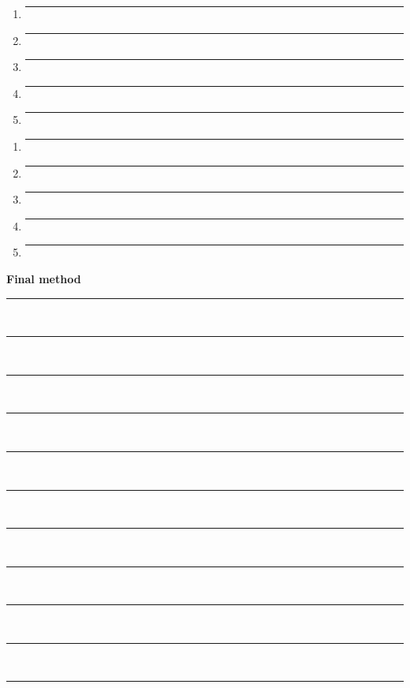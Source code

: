 \documentclass[12pt]{article}
\begin{document}
\begin{minipage}{0.48\textwidth}
\begin{enumerate}[leftmargin=2em]
    \item \rule{\linewidth}{0.4pt}
    \item \rule{\linewidth}{0.4pt}
    \item \rule{\linewidth}{0.4pt}
    \item \rule{\linewidth}{0.4pt}
    \item \rule{\linewidth}{0.4pt}
\end{enumerate}
\end{minipage}
\hfill
\begin{minipage}{0.48\textwidth}
\begin{enumerate}[leftmargin=2em, start=4]
    \item \rule{\linewidth}{0.4pt}
    \item \rule{\linewidth}{0.4pt}
    \item \rule{\linewidth}{0.4pt}
    \item \rule{\linewidth}{0.4pt}
    \item \rule{\linewidth}{0.4pt}
\end{enumerate}
\end{minipage}

\vspace{3em}


\textbf{Final method}

\vspace{1em}
\rule{\textwidth}{0.4pt}\\[1.2em]
\rule{\textwidth}{0.4pt}\\[1.2em]
\rule{\textwidth}{0.4pt}\\[1.2em]
\rule{\textwidth}{0.4pt}\\[1.2em]
\rule{\textwidth}{0.4pt}\\[1.2em]
\vspace{1em}
\rule{\textwidth}{0.4pt}\\[1.2em]
\rule{\textwidth}{0.4pt}\\[1.2em]
\rule{\textwidth}{0.4pt}\\[1.2em]
\rule{\textwidth}{0.4pt}\\[1.2em]
\rule{\textwidth}{0.4pt}\\[1.2em]
\rule{\textwidth}{0.4pt}\\[1.2em]
\end{document}
